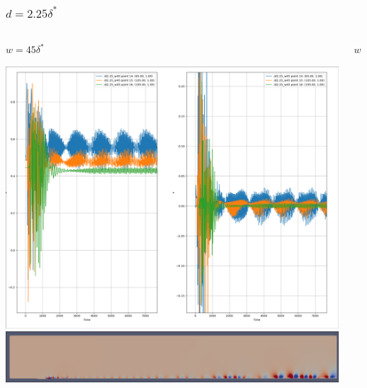 \documentclass[
  aspectratio=169, %
  t, %
  onlytextwidth, %
  10pt, %
]{beamer}
\begin{document}
\begin{frame}
	\frametitle{$d=2.25\delta^*$}
	
	\centering
	\begin{columns}[T] %
		\begin{column}{0.45\linewidth} %
			$w=45\delta^*$

			\includegraphics[width=\textwidth]{Images/d2.25_w45.png}
			\includegraphics[width=\textwidth]{Images/d2.25_w45_dom.png}
		\end{column}
		\begin{column}{0.45\linewidth} %
			$w=50\delta^*$	


\end{column}
\end{columns}
\end{frame}
\end{document}
